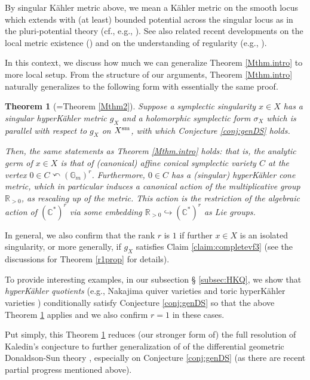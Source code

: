 \documentclass[12pt,a4paper]{amsart}
\newtheorem{Thm}{Theorem}[section]
\theoremstyle{remark}
\theoremstyle{definition}
\def\R{\mathbb{R}}
\def\C{\mathbb{C}}
\begin{document}
By singular K\"ahler metric above, 
we mean a K\"ahler metric on 
the smooth locus which extends 
with (at least) 
bounded potential across 
the singular locus as in the 
pluri-potential theory (cf., e.g., 
\cite{EGZ, GZ}). 
See also related recent developments on the local metric existence 
(\cite{Fu, GGZ}) and on the understanding of regularity 
(e.g., \cite{CS2,Sze24, CCHSTT}). 

In this context, 
we discuss how much we can generalize Theorem 
\ref{Mthm.intro} 
to more local setup. 
From the structure of our arguments, 
Theorem \ref{Mthm.intro} naturally generalizes to 
the following form with essentially the same proof. 

\begin{Thm}[=Theorem \ref{Mthm2}]\label{Mthm2.intro}
Suppose a symplectic singularity 
$x\in X$ has 
a singular hyperK\"ahler metric $g_X$ and 
a holomorphic symplectic form $\sigma_X$ which is 
parallel with respect to $g_X$ on $X^{\rm sm}$, 
with which Conjecture \ref{conj:genDS} holds. 

Then, the same statements as Theorem \ref{Mthm.intro} holds: that is, the analytic germ of $x\in X$ is that of (canonical) 
affine conical symplectic variety $C$ at the vertex $0\in C\curvearrowleft (\mathbb{G}_m)^r$. 
Furthermore, $0\in C$ has a (singular) hyperK\"ahler cone  metric, %
which in particular induces a canonical action 
of 
the multiplicative group $\R_{>0}$, 
as rescaling up of the metric. This action is the restriction of  
the algebraic action of $(\C^*)^r$ 
via some embedding $\R_{>0}\hookrightarrow (\C^*)^r$ 
as Lie groups. 
\end{Thm}

In general, we also confirm that the rank $r$ is $1$ if further $x\in X$ is 
an isolated singularity, 
or more generally, if $g_X$ satisfies Claim \ref{claim:completevf3} 
(see the discussions for Theorem \ref{r1prop} for details). 

To provide interesting examples, in our subsection \S 
\ref{subsec:HKQ}, 
we show that {\it hyperK\"ahler quotients} 
\cite{HKLR} 
(e.g., 
Nakajima quiver varieties \cite{Nakajima} 
and toric hyperK\"ahler varieties \cite{Goto, BD, HSt}) conditionally 
satisfy Conjecture \ref{conj:genDS} so that the above Theorem 
\ref{Mthm2.intro} applies and we also confirm $r=1$ in these cases. 

Put simply, this Theorem \ref{Mthm2.intro}  
reduces (our stronger form of) the full resolution of 
Kaledin's conjecture to further generalization of 
of the differential geometric 
Donaldson-Sun theory \cite{DSII}, especially on 
Conjecture \ref{conj:genDS} (as there are recent partial progress 
mentioned above). 
\end{document}
